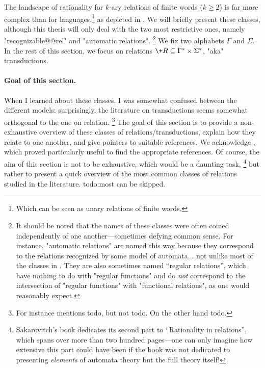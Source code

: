 The landscape of rationality for $k$-ary relations of finite words ($k \geq 2$) is far more complex than for languages,\footnote{Which can be seen as unary relations of finite words.} as depicted in . We will briefly present these classes,
although this thesis will only deal with the two most restrictive ones, namely
"recognizable@@rel" and "automatic relations".%
\footnote{It should be noted that the names
of these classes were often coined independently of one another---sometimes defying common sense.
For instance, "automatic relations" are named this way because they correspond to
the relations recognized by some model of automata...
not unlike most of the classes in .
They are also sometimes named ``regular relations'', which have nothing to do
with "regular functions" and do \emph{not} correspond to the intersection of "regular functions"
with "functional relations", as one would reasonably expect.}
We fix two alphabets $\Gamma$ and $\Sigma$. In the rest of this section, we focus
on relations $\+R \subseteq \Gamma^* \times \Sigma^*$, "aka" transductions.

\paragraph*{Goal of this section.}
When I learned about these classes, I was somewhat confused between the different models: surprisingly, the literature on transductions seems somewhat orthogonal to the one on relation.%
\footnote{For instance \cite{Choffrut2006Survey} mentions todo, but not todo. On the other hand todo.}
The goal of this section is to provide a non-exhaustive overview of these classes of relations/transductions, explain how they relate to one another, and give pointers to suitable references.
We acknowledge \cite{Choffrut2006Survey}, which proved particularly useful to find the
appropriate references. Of course, the aim of this section is not to be exhaustive,
which would be a daunting task,%
\footnote{Sakarovitch's book \cite{Sakarovitch2009Elements}
dedicates its second part to ``Rationality in relations'', which spans over more than two hundred pages---one can only imagine how extensive this part could have been if the book was not
dedicated to presenting \emph{elements} of automata theory but the full theory itself!}
but rather to present a quick overview of the most common classes of relations
studied in the literature.
todo:most can be skipped.

